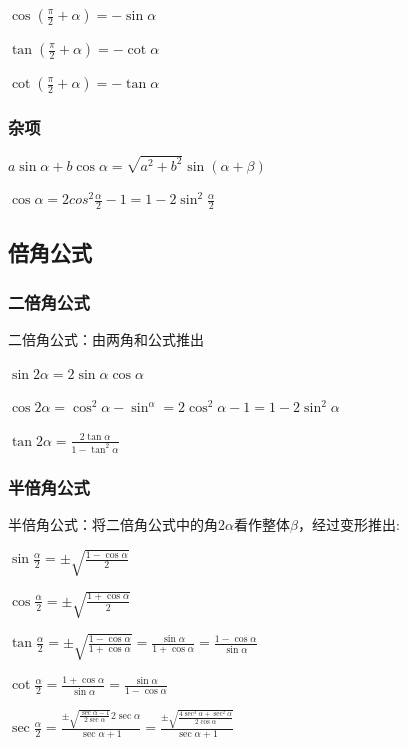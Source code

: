 \documentclass[UTF8]{ctexbook}
\begin{document}
{{{{    $\cos(\frac{\pi}{2} + \alpha) = -\sin\alpha$

    $\tan(\frac{\pi}{2} + \alpha) = -\cot\alpha$

    $\cot(\frac{\pi}{2} + \alpha) = -\tan\alpha$
  }%

  \subsubsection{杂项}{
    $a\sin\alpha + b\cos\alpha = \sqrt{a^2 + b^2}\sin(\alpha+\beta)$

    $\cos\alpha = 2cos^2\frac{\alpha}{2} - 1 = 1-2\sin^2\frac{\alpha}{2}$
  }%

}%

\subsection{倍角公式}{

  \subsubsection{二倍角公式}{
    二倍角公式：由两角和公式推出

    $\sin2\alpha = 2\sin\alpha\cos\alpha$

    $\cos2\alpha = \cos^2\alpha - \sin^\alpha = 2\cos^2\alpha - 1 = 1 - 2\sin^2\alpha$

    $\tan2\alpha = \frac{2\tan\alpha}{1 - \tan^2\alpha}$
  }%

  \subsubsection{半倍角公式}{
    半倍角公式：将二倍角公式中的角$2\alpha$看作整体$\beta$，经过变形推出:

    $\sin\frac{\alpha}{2} = \pm\sqrt{\frac{1 - \cos\alpha}{2}}$

    $\cos\frac{\alpha}{2} = \pm\sqrt{\frac{1 + \cos\alpha}{2}}$

    $\tan\frac{\alpha}{2} = \pm\sqrt{\frac{1-\cos\alpha}{1+\cos\alpha}} = \frac{\sin\alpha}{1+\cos\alpha} = \frac{1-\cos\alpha}{\sin\alpha}$

    $\cot\frac{\alpha}{2} = \frac{1+\cos\alpha}{\sin\alpha} = \frac{\sin\alpha}{1-\cos\alpha}$

    $\sec\frac{\alpha}{2} = \frac{\pm\sqrt{\frac{\sec\alpha - 1}{2\sec\alpha}}2\sec\alpha}{\sec\alpha + 1} = \frac{\pm\sqrt{\frac{4\sec^3\alpha + \sec^2\alpha}{2\cos\alpha}}}{\sec\alpha + 1}$

}}}}
\end{document}
